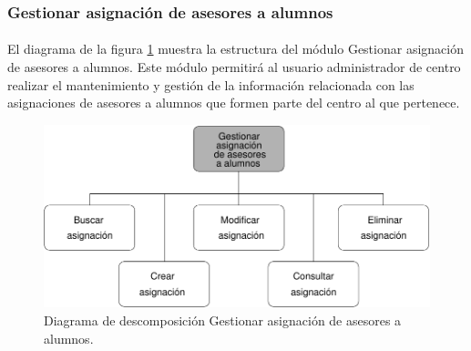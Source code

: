 \subsubsection{Gestionar asignación de asesores a alumnos}

  \paragraph{}El diagrama de la figura
  \ref{diagramaDescomposicionGestionarAsignacion} muestra la
  estructura del módulo Gestionar asignación de asesores a alumnos. Este módulo
  permitirá al usuario administrador de centro realizar el mantenimiento y
  gestión de la información relacionada con las asignaciones de asesores a
  alumnos que formen parte del centro al que pertenece.

  \begin{figure}[!ht]
    \begin{center}
      \includegraphics[]{11.Disenyo_Arquitectonico/11.2.Diagramas_Descomposicion/11.2.3.Modulo_administrador_centro/AdministrarBBDD/GestionarAsignacion/Diagramas/gestionar_asignacion.pdf}
      \caption{Diagrama de descomposición Gestionar asignación de asesores a alumnos.}
      \label{diagramaDescomposicionGestionarAsignacion}
    \end{center}
  \end{figure}
